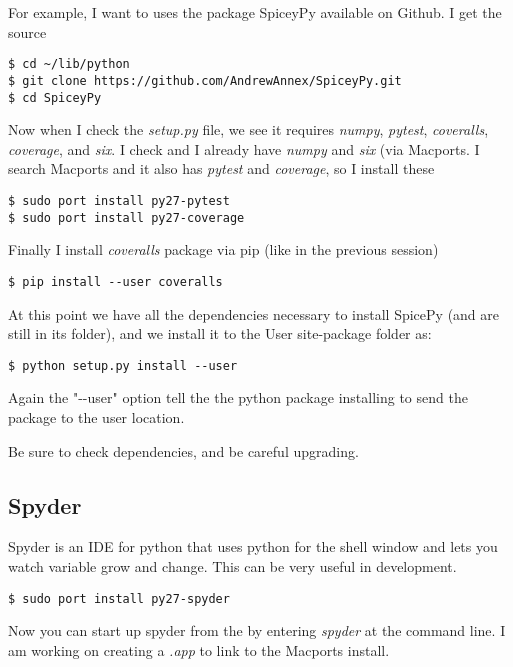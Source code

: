 \documentclass[11pt]{article}
\begin{document}
For example, I want to uses the package SpiceyPy available on Github. I get the source
\begin{lstlisting}[style=Bash]
$ cd ~/lib/python
$ git clone https://github.com/AndrewAnnex/SpiceyPy.git
$ cd SpiceyPy
\end{lstlisting}
Now when I check the {\it setup.py} file, we see it requires {\it numpy}, {\it pytest}, {\it coveralls}, {\it coverage}, and {\it six}. I check and I already have {\it numpy} and {\it six} (via Macports. I search Macports and it also has {\it pytest} and {\it coverage}, so I install these
\begin{lstlisting}[style=Bash]
$ sudo port install py27-pytest
$ sudo port install py27-coverage
\end{lstlisting}
Finally I install {\it coveralls} package via pip (like in the previous session)
\begin{lstlisting}[style=Bash]
$ pip install --user coveralls
\end{lstlisting}
At this point we have all the dependencies necessary to install SpicePy (and are still in its folder), and we install it to the User site-package folder as:
\begin{lstlisting}[style=Bash]
$ python setup.py install --user
\end{lstlisting}
Again the "-{}-user" option tell the the python package installing to send the package to the user location.

Be sure to check dependencies, and be careful upgrading.


\subsection{Spyder}
Spyder is an IDE for python that uses python for the shell window and lets you watch variable grow and change. This can be very useful in development.
\begin{lstlisting}[style=Bash]
$ sudo port install py27-spyder
\end{lstlisting}
Now you can start up spyder from the by entering {\it spyder} at the command line. I am working on creating a {\it .app} to link to the Macports install.
\end{document}
